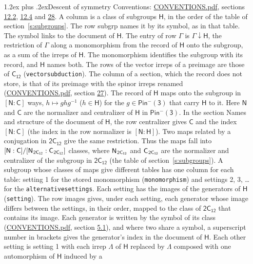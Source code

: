 \documentclass[10pt,a4paper]{article}
\makeatletter
\renewcommand\section{\@startsection{section}{1}{\z@}{-3ex plus -1ex minus -.2ex}%
  {1.2ex plus .2ex}{\normalfont\large\sffamily\bfseries\color{parttitle}}}
\numberwithin{equation}{section}
\newcommand{\grp}[1]{\mathsf{#1}}
\newcommand{\grpindex}[2]{[#1 : #2]}
\newcommand{\restr}[2]{#1\!\downarrow#2}
\newcommand{\hairsp}{\mkern1mu}
\makeatother
\begin{document}
\section{Descent of symmetry}\label{s:subduction}
Conventions: \href{../../CONVENTIONS.pdf}{CONVENTIONS.pdf}, sections \href{../../../rotation/CONVENTIONS.pdf\#conv.12.2}{12.2}, \href{../../../rotation/CONVENTIONS.pdf\#conv.12.4}{12.4} and \href{../../CONVENTIONS.pdf\#conv.28}{28}.
A column is a class of subgroups $\grp{H}$, in the order of the table of section~\ref{s:subgroups}. The row subgrp names it by its symbol, as in that table. The symbol links to the document of $\grp{H}$. The entry of row $\Gamma$ is $\restr{\Gamma}{\grp{H}}$, the restriction of $\Gamma$ along a monomorphism from the record of $\grp{H}$ onto the subgroup, as a sum of the irreps of $\grp{H}$. The monomorphism identifies the subgroup with its record, and $\grp{H}$ names both. The rows of the vector irreps of a preimage are those of \href{../../../rotation/data/pdf/C12.pdf}{$\grp{C_{12}}$} (\texttt{vectorsubduction}). The column of a section, which the record does not store, is that of its preimage with the spinor irreps renamed (\href{../../CONVENTIONS.pdf}{CONVENTIONS.pdf}, section \href{../../CONVENTIONS.pdf\#conv.27}{27}). \label{n:group.normalizer.o3}\label{n:group.centralizer.o3}\label{n:element.h}The record of $\grp{H}$ maps onto the subgroup in $\grpindex{\grp{N}}{\grp{C}}$ ways, $h \mapsto g h g^{-1}$ ($h \in \grp{H}$) for the $g \in \grp{Pin^{-}(3)}$ that carry $\grp{H}$ to it. Here $\grp{N}$ and $\grp{C}$ are the normalizer and centralizer of $\grp{H}$ in \href{Pinminus3.pdf}{$\grp{Pin^{-}(3)}$}. In the section Names and structure of the document of $\grp{H}$, the row centralizer gives $\grp{C}$ and the index $\grpindex{\grp{N}}{\grp{C}}$ (the index in the row normalizer is $\grpindex{\grp{N}}{\grp{H}}$). Two maps related by a conjugation in $\grp{2C_{12}}$ give the same restriction. Thus the maps fall into $\grpindex{\grp{N}}{\grp{C}}/\grpindex{\grp{N}_{\hairsp \grp{2C_{12}}}}{\grp{C}_{\hairsp \grp{2C_{12}}}}$ classes, where $\grp{N}_{\hairsp \grp{2C_{12}}}$ and $\grp{C}_{\hairsp \grp{2C_{12}}}$ are the normalizer and centralizer of the subgroup in $\grp{2C_{12}}$ (the table of section~\ref{s:subgroups}). \label{n:head.setting}A subgroup whose classes of maps give different tables has one column for each table: setting 1 for the stored monomorphism (\texttt{monomorphism}) and settings 2, 3, \dots{} for the \texttt{alternativesettings}. Each setting has the images of the generators of $\grp{H}$ (\texttt{setting}). \label{n:head.images}The row images gives, under each setting, each generator whose image differs between the settings, in their order, mapped to the class of $\grp{2C_{12}}$ that contains its image. Each generator is written by the symbol of its class (\href{../../CONVENTIONS.pdf}{CONVENTIONS.pdf}, section \href{../../../rotation/CONVENTIONS.pdf\#conv.5.1}{5.1}), and where two share a symbol, a superscript number in brackets gives the generator's index in the document of $\grp{H}$. \label{n:irrep.Delta}Each other setting is setting 1 with each irrep $\Lambda$ of $\grp{H}$ replaced by $\Lambda$ composed with one automorphism of $\grp{H}$ induced by a 
\end{document}
